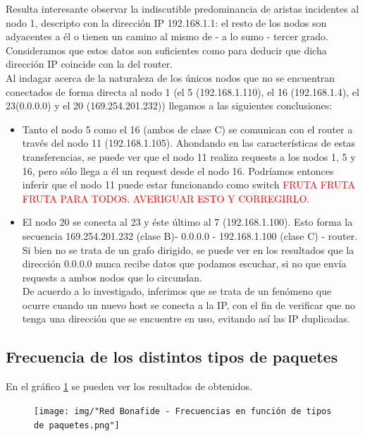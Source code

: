 Resulta interesante observar la indiscutible predominancia de aristas incidentes al nodo 1, descripto con la dirección IP 192.168.1.1: el resto de los nodos son adyacentes a él o tienen un camino al mismo de - a lo sumo - tercer grado.\\
Consideramos que estos datos son suficientes como para deducir que dicha dirección IP coincide con la del router.\\
Al indagar acerca de la naturaleza de los únicos nodos que no se encuentran conectados de forma directa al nodo 1 (el 5 (192.168.1.110), el 16 (192.168.1.4), el 23(0.0.0.0) y el 20 (169.254.201.232)) llegamos a las siguientes conclusiones: \\
\begin{itemize}
	\item Tanto el nodo 5 como el 16 (ambos de clase C) se comunican con el router a través del nodo 11 (192.168.1.105). Ahondando en las características de estas transferencias, se puede ver que el nodo 11 realiza requests a los nodos 1, 5 y 16, pero sólo llega a él un request desde el nodo 16. Podríamos entonces inferir que el nodo 11 puede estar funcionando como switch \textcolor{red}{FRUTA FRUTA FRUTA PARA TODOS. AVERIGUAR ESTO Y CORREGIRLO.}
	\item El nodo 20 se conecta al 23 y éste último al 7 (192.168.1.100). Esto forma la secuencia 169.254.201.232 (clase B)- 0.0.0.0 - 192.168.1.100 (clase C) - router. Si bien no se trata de un grafo dirigido, se puede ver en los resultados que la dirección 0.0.0.0 nunca recibe datos que podamos escuchar, si no que envía requests a ambos nodos que lo circundan.\\ De acuerdo a lo investigado, inferimos que se trata de un fenómeno que ocurre cuando un nuevo host se conecta a la IP, con el fin de verificar que no tenga una dirección que se encuentre en uso, evitando así las IP duplicadas.\\
\end{itemize}


\subsection{Frecuencia de los distintos tipos de paquetes}

En el gráfico \ref{bonafide:paquetes} se pueden ver los resultados de obtenidos.

\begin{figure}[h!]
    \centering                                                       
    \texttt{[image: img/"Red Bonafide - Frecuencias en función de tipos de paquetes.png"]}
    \caption{}
    \label{bonafide:paquetes}
\end{figure}

